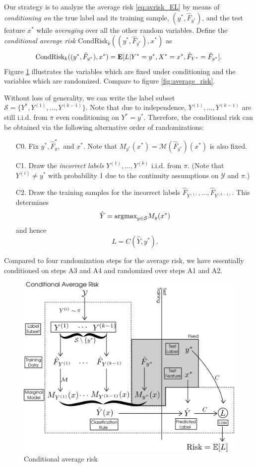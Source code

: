 Our strategy is to analyze the average risk \eqref{eq:avrisk_EL} by
means of \emph{conditioning on} the true label and its training
sample, $(y^*, \hat{F}_{y^*})$, and the test feature $x^*$
while \emph{averaging} over all the other random variables.  Define
the \emph{conditional average risk} $\text{CondRisk}_k((y^*, \hat{F}_{y^*}), x^*)$ as
\[
\text{CondRisk}_k((y^*, \hat{F}_{y^*}), x^*) = \textbf{E}[L|Y^*=y^*, X^* = x^*, \hat{F}_{Y^*} = \hat{F}_{y^*}].
\]
Figure \ref{fig:conditional_risk} illustrates the variables which are
fixed under conditioning and the variables which are randomized.
Compare to figure \ref{fig:average_risk}.

Without loss of generality, we can write the label subset $\mathcal{S}
= \{Y^*, Y^{(1)},\hdots, Y^{(k-1)}\}$.  Note that due to independence,
$Y^{(1)},\hdots, Y^{(k-1)}$ are still i.i.d. from $\pi$ even
conditioning on $Y^* = y^*.$ Therefore, the conditional risk can be
obtained via the following alternative order of randomizations:
\begin{enumerate}
\item[C0.] 
Fix $y^*, \hat{F}_y^*,$ and $x^*$.  Note that $M_{y^*}(x^*)
= \mathcal{M}(\hat{F}_{y^*})(x^*)$ is also fixed.
\item[C1.]
Draw the \emph{incorrect labels} $Y^{(1)},\hdots, Y^{(k)}$ i.i.d. from
$\pi$.  (Note that $Y^{(i)} \neq y^*$ with probability 1 due to the
continuity assumptions on $\mathcal{Y}$ and $\pi$.)
\item[C2.]
Draw the training samples for the incorrect labels
$\hat{F}_{Y^{(1)}},\hdots, \hat{F}_{Y^{(k-1)}}$.  This determines
\[
\hat{Y} = \text{argmax}_{y \in \mathcal{S}} M_y(x^*)
\]
and hence
\[
L = C(\hat{Y}, y^*).
\]
\end{enumerate}
Compared to four randomization steps for the average risk, we have
essentially conditioned on steps A3 and A4 and randomized over steps
A1 and A2.

\begin{figure}[h]
\centering
\includegraphics[scale = 0.3]{../extrapolation_figures/conditional_risk.png}
\caption{Conditional average risk}\label{fig:conditional_risk}
\end{figure}


